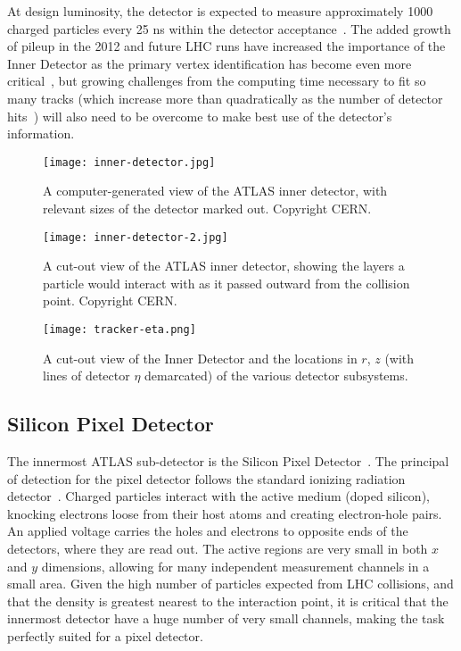 At design luminosity, the detector is expected to measure approximately 1000 charged particles every 25 ns within the detector acceptance~\cite{ATLASExpected}. The added growth of pileup in the 2012 and future LHC runs have increased the importance of the Inner Detector as the primary vertex identification has become even more critical~\cite{ATLAS-CONF-2012-042}, but growing challenges from the computing time necessary to fit so many tracks (which increase more than quadratically as the number of detector hits~\cite{Combinatorics}) will also need to be overcome to make best use of the detector's information.


\begin{figure}
\centering
\texttt{[image: inner-detector.jpg]}
\label{fig:detector:inner-detector}
\caption{A computer-generated view of the ATLAS inner detector, with relevant sizes of the detector marked out. Copyright CERN.}
\end{figure}



\begin{figure}
\centering
\texttt{[image: inner-detector-2.jpg]}
\label{fig:detector:inner-detector-2}
\caption{A cut-out view of the ATLAS inner detector, showing the layers a particle would interact with as it passed outward from the collision point. Copyright CERN.}
\end{figure}



\begin{figure}
\centering
\texttt{[image: tracker-eta.png]}
\label{fig:detector:inner-detector-3}
\caption{A cut-out view of the Inner Detector and the locations in $r$, $z$ (with lines of detector $\eta$ demarcated) of the various detector subsystems.}
\end{figure}



\subsection{Silicon Pixel Detector}

The innermost ATLAS sub-detector is the Silicon Pixel Detector~\cite{Pixel,ATLASPaper}. The principal of detection for the pixel detector follows the standard ionizing radiation detector~\cite{Detectors}. Charged particles interact with the active medium (doped silicon), knocking electrons loose from their host atoms and creating electron-hole pairs. An applied voltage carries the holes and electrons to opposite ends of the detectors, where they are read out. The active regions are very small in both $x$ and $y$ dimensions, allowing for many independent measurement channels in a small area. Given the high number of particles expected from LHC collisions, and that the density is greatest nearest to the interaction point, it is critical that the innermost detector have a huge number of very small channels, making the task perfectly suited for a pixel detector.

